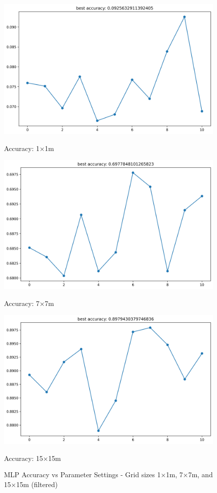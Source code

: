 \documentclass[runningheads]{llncs}
\begin{document}
\begin{figure}[H]
	\centering
	\begin{minipage}{0.32\textwidth}
		\centering
		\includegraphics[width=\textwidth]{figures/mlp_acc_1.png}
		\caption*{Accuracy: 1×1m}
	\end{minipage}
	\hfill
	\begin{minipage}{0.32\textwidth}
		\centering
		\includegraphics[width=\textwidth]{figures/mlp_acc_7.png}
		\caption*{Accuracy: 7×7m}
	\end{minipage}
	\hfill
	\begin{minipage}{0.32\textwidth}
		\centering
		\includegraphics[width=\textwidth]{figures/mlp_acc_15.png}
		\caption*{Accuracy: 15×15m}
	\end{minipage}
	\caption{MLP Accuracy vs Parameter Settings - Grid sizes 1×1m, 7×7m, and 15×15m (filtered)}
\end{figure}
\end{document}
